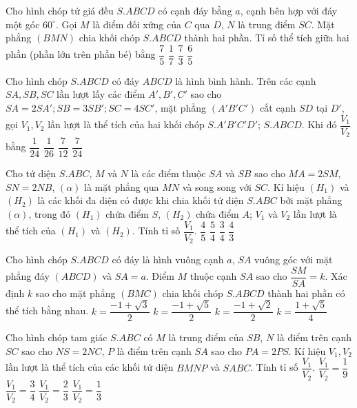 \begin{ex}%
	Cho hình chóp tứ giá đều $S.ABCD$ có cạnh đáy bằng $a$, cạnh bên hợp với đáy một góc $60^{\circ}$. Gọi $M$ là điểm đối xứng của $C$ qua $D$, $N$ là trung điểm $SC$. Mặt phẳng $(BMN)$ chia khối chóp $S.ABCD$ thành hai phần. Tỉ số thể tích giữa hai phần (phần lớn trên phần bé) bằng 
	\choice
	{\True $\dfrac{7}{5}$}
	{$\dfrac{1}{7}$}
	{$\dfrac{7}{3}$}
	{$\dfrac{6}{5}$}
\end{ex}

\begin{ex}%
	Cho hình chóp $S.ABCD$ có đáy $ABCD$ là hình bình hành. Trên các cạnh $SA,SB,SC$ lần lượt lấy các điểm $A',B',C'$ sao cho $SA=2SA';SB=3SB';SC=4SC'$, mặt phẳng $(A'B'C')$ cắt cạnh $SD$ tại $D'$, gọi $V_1,V_2$ lần lượt là thể tích của hai khối chóp $S.A'B'C'D'$; $S.ABCD$. Khi đó $\dfrac{V_1}{V_2}$ bằng 
	\choice
	{\True $\dfrac{1}{24}$}
	{$\dfrac{1}{26}$}
	{$\dfrac{7}{12}$}
	{$\dfrac{7}{24}$}
\end{ex}

\begin{ex}%
	Cho tứ diện $S.ABC$, $M$ và $N$ là các điểm thuộc $SA$ và $SB$ sao cho $MA=2SM$, $SN=2NB$, $(\alpha)$ là mặt phẳng qua $MN$ và song song với $SC$. Kí hiệu $(H_1)$ và $(H_2)$ là các khối đa diện có được khi chia khối tứ diện $S.ABC$ bởi mặt phẳng $(\alpha)$, trong đó $(H_1)$ chứa điểm $S$, $(H_2)$ chứa điểm $A$; $V_1$ và $V_2$ lần lượt là thể tích của $(H_1)$ và $(H_2)$. Tính tỉ số $\dfrac{V_1}{V_2}$. 
	\choice
	{\True $\dfrac{4}{5}$}
	{$\dfrac{5}{4}$}
	{$\dfrac{3}{4}$}
	{$\dfrac{4}{3}$}
\end{ex}

\begin{ex}%
	Cho hình chóp $S.ABCD$ có đáy là hình vuông cạnh $a$, $SA$ vuông góc với mặt phẳng đáy $(ABCD)$ và $SA=a$. Điểm $M$ thuộc cạnh $SA$ sao cho $\dfrac{SM}{SA}=k$. Xác định $k$ sao cho mặt phẳng $(BMC)$ chia khối chóp $S.ABCD$ thành hai phần có thể tích bằng nhau. 
	\choice
	{$k=\dfrac{-1+\sqrt{3}}{2}$}
	{\True $k=\dfrac{-1+\sqrt{5}}{2}$}
	{$k=\dfrac{-1+\sqrt{2}}{2}$}
	{$k=\dfrac{1+\sqrt{5}}{4}$}
\end{ex}

\begin{ex}%
	Cho hình chóp tam giác $S.ABC$ có $M$ là trung điểm của $SB$, $N$ là điểm trên cạnh $SC$ sao cho $NS=2NC$, $P$ là điểm trên cạnh $SA$ sao cho $PA=2PS$. Kí hiệu $V_1,V_2$ lần lượt là thể tích của các khối tứ diện $BMNP$ và $SABC$. Tính tỉ số $\dfrac{V_1}{V_2}$. 
	\choice
	{\True $\dfrac{V_1}{V_2}=\dfrac{1}{9}$}
	{$\dfrac{V_1}{V_2}=\dfrac{3}{4}$}
	{$\dfrac{V_1}{V_2}=\dfrac{2}{3}$}
	{$\dfrac{V_1}{V_2}=\dfrac{1}{3}$}
\end{ex}

